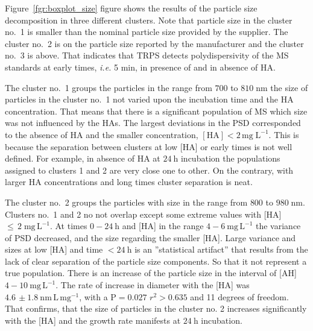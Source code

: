\documentclass[journal=langd5,manuscript=article]{achemso}
\begin{document}
Figure~\ref{fgr:boxplot_size} figure  shows the results of the particle size decomposition in three
different clusters. Note that particle size in the cluster no.~1 is smaller than the nominal particle size provided by the supplier. 
The cluster no.~2 is on the particle size reported by the manufacturer and the cluster no.~3 is above.
That indicates that TRPS
detects polydispersivity of the MS standards at early times, {\em i.e.} 5 min, in presence of  and in absence of HA.


The cluster no.~1 groups the particles in the range from $700$ to $810\;\mathrm{nm}$
the size of particles in the cluster no.~1 not varied upon the incubation time and the HA concentration. That means that there is a significant population of MS which size was not influenced by the HAs.
The largest deviations in the PSD corresponded to the absence of HA and the smaller concentration, 
$\mathrm{[HA]  < 2\,mg\;L^{-1}}$.
This is because the separation between clusters at low [HA] or early times is not well defined. For example, in absence of HA at $24~\mathrm{h}$ incubation the populations assigned to clusters 1 and 2 are very close one to other. On the contrary, with larger HA concentrations and long  times cluster separation is neat.


The cluster no.~2 groups the particles with size in the range from $800$ to $980\;\mathrm{nm}$.
Clusters no.~1 and 2 no not overlap except some extreme values with [HA]$\leq\, 2\;\mathrm{mg\,L^{-1}}$. At times $0 - 24~\mathrm{h}$ and
[HA] in the range $4 - 6~\mathrm{mg\, L^{-1}}$ the variance of PSD decreased, and the size regarding the smaller [HA].
Large variance  and sizes at low [HA] and time $< 24~\mathrm{h}$ is an ''statistical artifact'' that results from the lack of clear separation of the particle size components. So that it not represent a true population.
There is an increase of the particle size in the interval
of [AH] $4-10~\mathrm{mg\,L^{-1}}$.
The rate of increase in diameter with the [HA] was
$4.6\,\pm 1.8~\mathrm{nm\,L\,mg^{-1}}$, with a $\mathrm{P = 0.027}$ $r^2 > 0.635$ and 11 degrees of freedom. 
That confirms, that the size of particles in the cluster no. 2 increases significantly with the [HA] and the growth rate manifests at $24~\mathrm{h}$ incubation.
\end{document}

